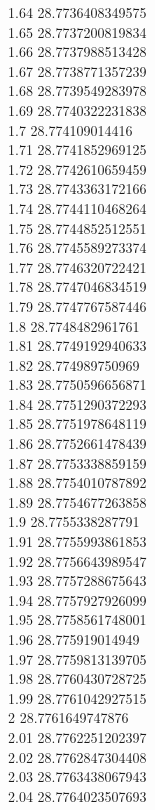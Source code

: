 {1.64	28.7736408349575\\
1.65	28.7737200819834\\
1.66	28.7737988513428\\
1.67	28.7738771357239\\
1.68	28.7739549283978\\
1.69	28.7740322231838\\
1.7	28.774109014416\\
1.71	28.7741852969125\\
1.72	28.7742610659459\\
1.73	28.7743363172166\\
1.74	28.7744110468264\\
1.75	28.7744852512551\\
1.76	28.7745589273374\\
1.77	28.7746320722421\\
1.78	28.7747046834519\\
1.79	28.7747767587446\\
1.8	28.7748482961761\\
1.81	28.7749192940633\\
1.82	28.774989750969\\
1.83	28.7750596656871\\
1.84	28.7751290372293\\
1.85	28.7751978648119\\
1.86	28.7752661478439\\
1.87	28.7753338859159\\
1.88	28.7754010787892\\
1.89	28.7754677263858\\
1.9	28.7755338287791\\
1.91	28.7755993861853\\
1.92	28.7756643989547\\
1.93	28.7757288675643\\
1.94	28.7757927926099\\
1.95	28.7758561748001\\
1.96	28.775919014949\\
1.97	28.7759813139705\\
1.98	28.7760430728725\\
1.99	28.7761042927515\\
2	28.7761649747876\\
2.01	28.7762251202397\\
2.02	28.7762847304408\\
2.03	28.7763438067943\\
2.04	28.7764023507693\\
}
